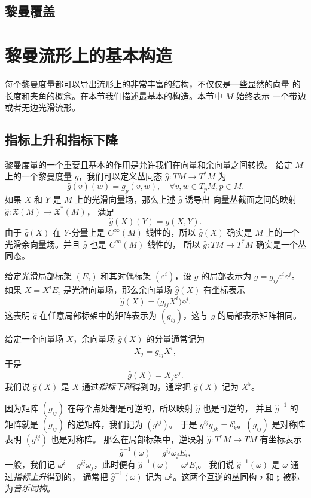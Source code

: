 \subsection{黎曼覆盖}

\section{黎曼流形上的基本构造}

每个黎曼度量都可以导出流形上的非常丰富的结构，不仅仅是一些显然的向量
的长度和夹角的概念。在本节我们描述最基本的构造。本节中 $M$ 始终表示
一个带边或者无边光滑流形。

\subsection{指标上升和指标下降}

黎曼度量的一个重要且基本的作用是允许我们在向量和余向量之间转换。
给定 $M$ 上的一个黎曼度量 $g$，我们可以定义丛同态 $\hat g:TM\to T^*M$
为
\[
  \hat g(v)(w)=g_p(v,w),\quad \forall v,w\in T_pM, p\in M.
\]
如果 $X$ 和 $Y$ 是 $M$ 上的光滑向量场，那么上述 $\hat g$ 诱导出
向量丛截面之间的映射 $\hat g:\mathfrak X(M)\to \mathfrak X^*(M)$，
满足 
\[
  \hat g(X)(Y)=g(X,Y).
\]
由于 $\hat g(X)$ 在 $Y$-分量上是 $C^\infty(M)$ 线性的，所以 $\hat g(X)$
确实是 $M$ 上的一个光滑余向量场。并且 $\hat g$ 也是 $C^\infty(M)$ 线性的，
所以 $\hat g:TM\to T^*M$ 确实是一个丛同态。

给定光滑局部标架 $(E_i)$ 和其对偶标架 $(\varepsilon^i)$，设 $g$
的局部表示为 $g=g_{ij}\varepsilon^i\varepsilon^j$。如果 $X=X^iE_i$
是光滑向量场，那么余向量场 $\hat g(X)$ 有坐标表示
\[
  \hat g(X)=\bigl(g_{ij}X^i\bigr)\varepsilon^j.
\]
这表明 $\hat g$ 在任意局部标架中的矩阵表示为 $(g_{ij})$，这与 $g$ 的局部表示矩阵相同。

给定一个向量场 $X$，余向量场 $\hat g(X)$ 的分量通常记为
\[
  X_j=g_{ij}X^i,
\]
于是
\[
  \hat g(X)=X_j\varepsilon^j.
\]
我们说 $\hat g(X)$ 是 $X$ 通过\emph{指标下降}得到的，通常把 $\hat g(X)$ 记为 $X^\flat$。

因为矩阵 $(g_{ij})$ 在每个点处都是可逆的，所以映射 $\hat g$ 也是可逆的，
并且 $\hat g^{-1}$ 的矩阵就是 $(g_{ij})$ 的逆矩阵，我们记为 $(g^{ij})$。
于是 $g^{ij}g_{jk}=\delta^i_k$。$(g_{ij})$ 是对称阵表明 $(g^{ij})$ 也是对称阵。
那么在局部标架中，逆映射 $\hat g:T^*M\to TM$ 有坐标表示
\[
  \hat g^{-1}(\omega)=g^{ij}\omega_j E_i,
\]
一般，我们记 $\omega^i=g^{ij}\omega_j$，此时便有 $\hat g^{-1}(\omega)=\omega^i E_i$。
我们说 $\hat g^{-1}(\omega)$ 是 $\omega$ 通过\emph{指标上升}得到的，
通常把 $\hat g^{-1}(\omega)$ 记为 $\omega^\sharp$。这两个互逆的丛同构
$\flat$ 和 $\sharp$ 被称为\emph{音乐同构}。

